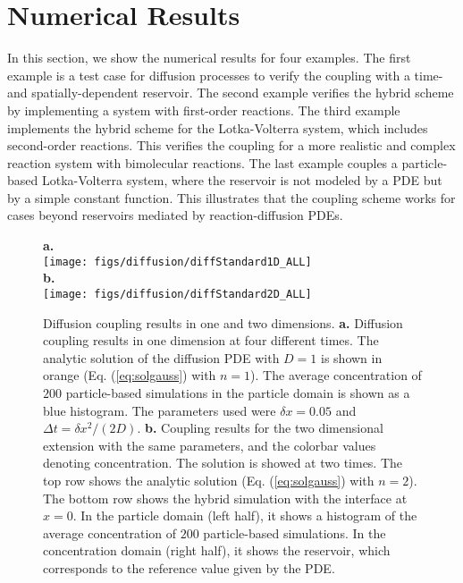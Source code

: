 \documentclass[10pt,twocolumn]{revtex4-1}
\begin{document}
	\section{Numerical Results}\label{sec:NumRes}
	In this section, we show the numerical results for four examples. The first example is a test case for diffusion processes to verify the coupling with a time- and spatially-dependent reservoir. The second example verifies the hybrid scheme by implementing a system with first-order reactions. The third example implements the hybrid scheme for the Lotka-Volterra system, which includes second-order reactions. This verifies the coupling for a more realistic and complex reaction system with bimolecular reactions. The last example couples a particle-based Lotka-Volterra system, where the reservoir is not modeled by a PDE but by a simple constant function. This illustrates that the coupling scheme works for cases beyond reservoirs mediated by reaction-diffusion PDEs.
	\begin{figure}[htb]
		\noindent
		\flushleft\textbf{a.} \\
		\texttt{[image: figs/diffusion/diffStandard1D\_ALL]} \\
		\textbf{b.} \\
		\texttt{[image: figs/diffusion/diffStandard2D\_ALL]} 
		\caption{Diffusion coupling results in one and two dimensions. \textbf{a.} Diffusion coupling results in one dimension at four different times. The analytic solution of the diffusion PDE with $D=1$ is shown in orange (Eq. (\ref{eq:solgauss}) with $n=1$). The average concentration of $200$ particle-based simulations in the particle domain is shown as a blue histogram. The parameters used were $\delta x = 0.05$ and $\Delta t = \delta x^2/(2D)$. \textbf{b.} Coupling results for the two dimensional extension with the same parameters, and the colorbar values denoting concentration. The solution is showed at two times. The top row shows the analytic solution (Eq. (\ref{eq:solgauss}) with $n=2$). The bottom row shows the hybrid simulation with the interface at $x=0$. In the particle domain (left half), it shows a histogram of the average concentration of $200$ particle-based simulations. In the concentration domain (right half), it shows the reservoir, which corresponds to the reference value given by the PDE.}
		\label{fig:diff1D}
	\end{figure}
	
\end{document}
